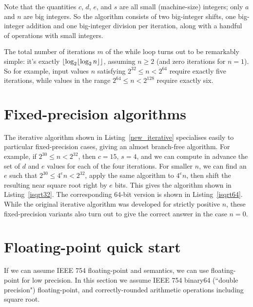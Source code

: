 \documentclass[a4paper]{article}
\DeclarePairedDelimiter\floor{\lfloor}{\rfloor}
\theoremstyle{plain}
\theoremstyle{definition}
\begin{document}
Note that the quantities $c$, $d$, $e$, and $s$ are all small (machine-size)
integers; only $a$ and $n$ are big integers. So the algorithm consists of
two big-integer shifts, one big-integer addition and one big-integer division per
iteration, along with a handful of operations with small integers.

The total number of iterations $m$ of the while loop turns out to be remarkably
simple: it's exactly $\floor{\log_2 \floor{\log_2 n}}$, assuming $n\ge 2$ (and zero
iterations for $n = 1$). So
for example, input values $n$ satisfying $2^{32} \le n < 2^{64}$ require exactly
five iterations, while values in the range $2^{64} \le n < 2^{128}$ require
exactly six.

\section{Fixed-precision algorithms}

The iterative algorithm shown in Listing~\ref{new_iterative} specialises easily
to particular fixed-precision cases, giving an almost branch-free algorithm.
For example, if $2^{30} \le n < 2^{32}$, then $c = 15$, $s=4$, and we can
compute in advance the set of $d$ and $e$ values for each of the four
iterations. For smaller $n$, we can find an $e$ such that $2^{30} \le 4^e n <
2^{32}$, apply the same algorithm to $4^e n$, then shift the resulting near
square root right by $e$ bits. This gives the algorithm shown in
Listing~\ref{isqrt32}. The corresponding 64-bit version is shown in
Listing~\ref{isqrt64}. While the original iterative algorithm was developed
for strictly positive $n$, these fixed-precision variants also turn out
to give the correct answer in the case $n = 0$.









\section{Floating-point quick start}

If we can assume IEEE 754 floating-point and semantics, we can use
floating-point for low precision. In this section we assume IEEE 754
binary64 (``double precision") floating-point, and correctly-rounded
arithmetic operations including square root.
\end{document}
